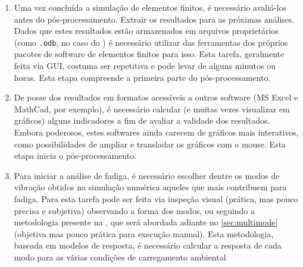 \begin{enumerate}[label=(\arabic*)]
    \item Uma vez concluída a simulação de elementos finitos, é necessário avaliá-los antes do pós-processamento. Extrair os resultados para as próximas análises. Dados que estes resultados estão armazenados em arquivos proprietários (como \texttt{.odb}, no caso do \abaqus) é necessário utilizar das ferramentas dos próprios pacotes de software de elementos finitos para isso. Esta tarefa, geralmente feita via GUI, costuma ser repetitiva e pode levar de alguns minutos ou horas. Esta etapa compreende a primeira parte do pós-processamento.
    \item De posse dos resultados em formatos acessíveis a outros software (MS Excel e MathCad, por exemplo), é necessário calcular (e muitas vezes visualizar em gráficos) alguns indicadores a fim de avaliar a validade dos resultados. Embora poderosos, estes softwares ainda carecem de gráficos mais interativos, como possibilidades de ampliar e transladar os gráficos com o mouse. Esta etapa inicia o pós-processamento.
    \item Para iniciar a análise de fadiga, é necessário escolher dentre os modos de vibração obtidos na simulação numérica aqueles que mais contribuem para fadiga. Para esta tarefa pode ser feita via inspeção visual (prática, mas pouco precisa e subjetiva) observando a forma dos modos, ou seguindo a metodologia presente na , que será abordada adiante no \autoref{sec:multimode} (objetiva mas pouco prática para execução manual). Esta metodologia, baseada em modelos de resposta, é necessário calcular a resposta de cada modo para as várias condições de carregamento ambiental
\end{enumerate}